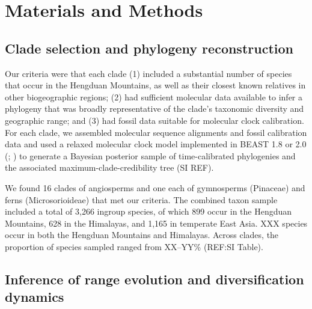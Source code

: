 \section{Materials and Methods}

\subsection{Clade selection and phylogeny reconstruction}

Our criteria were that each clade (1) included a substantial number of species that occur in the Hengduan Mountains, as well as their closest known relatives in other biogeographic regions; (2) had sufficient molecular data available to infer a phylogeny that was broadly representative of the clade's taxonomic diversity and geographic range; and (3) had fossil data suitable for molecular clock calibration. For each clade, we assembled molecular sequence alignments and fossil calibration data and used a relaxed molecular clock model implemented in BEAST 1.8 or 2.0 (\cite{Drummond2012}; \cite{Bouckaert2014}) to generate a Bayesian posterior sample of time-calibrated phylogenies and the associated maximum-clade-credibility tree (SI REF).

We found 16 clades of angiosperms and one each of gymnosperms (Pinaceae) and ferns (Microsorioideae) that met our criteria. The combined taxon sample included a total of 3,266 ingroup species, of which 899 occur in the Hengduan Mountains, 628 in the Himalayas, and 1,165 in temperate East Asia. XXX species occur in both the Hengduan Mountains and Himalayas. Across clades, the proportion of species sampled ranged from XX--YY\% (REF:SI Table).%

\subsection{Inference of range evolution and diversification dynamics}

